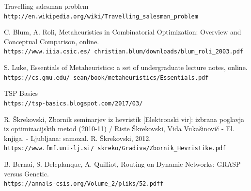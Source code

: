 \documentclass[12pt,a4paper]{amsart}
\theoremstyle{definition} %
\theoremstyle{plain} %
\begin{document}
\pagebreak
\begin{thebibliography}{99}

Travelling salesman problem
\\\texttt{http://en.wikipedia.org/wiki/Travelling\_salesman\_problem}

\bibitem{}
C. Blum, A. Roli, Metaheuristics in Combinatorial Optimization: Overview and Conceptual Comparison, online.
\\\texttt{https://www.iiia.csic.es/~christian.blum/downloads/blum\_roli\_2003.pdf}

\bibitem{}
S. Luke, Essentials of Metaheuristics: a set of undergraduate lecture notes, online.
\\\texttt{https://cs.gmu.edu/~sean/book/metaheuristics/Essentials.pdf}

\bibitem{}
TSP Basics
\\\texttt{https://tsp-basics.blogspot.com/2017/03/}

\bibitem{}
R. Škrekovski, Zbornik seminarjev iz hevristik [Elektronski vir]: izbrana poglavja iz optimizacijskih metod (2010-11) / Riste Škrekovski, Vida Vukašinovič - El. knjiga. - Ljubljana: samozal. R. Škrekovski, 2012. 
\\\texttt{https://www.fmf.uni-lj.si/~skreko/Gradiva/Zbornik\_Hevristike.pdf}

\bibitem{}
B. Bernai, S. Deleplanque, A. Quilliot, Routing on Dynamic Networks: GRASP versus Genetic.
\\\texttt{https://annals-csis.org/Volume\_2/pliks/52.pdff}

\end{thebibliography}
\end{document}
